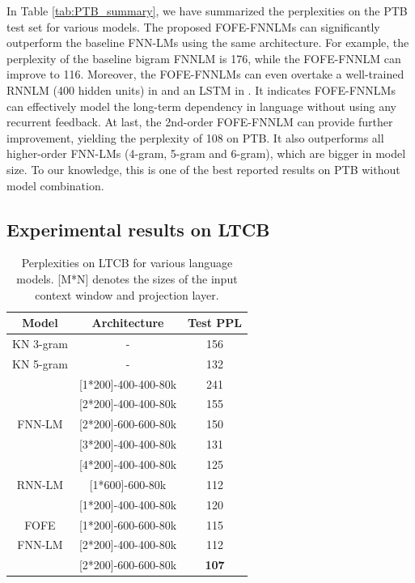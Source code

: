 \documentclass[11pt]{article}
\begin{document}
In Table \ref{tab:PTB_summary}, we have summarized the perplexities on the PTB test set for various models. The proposed FOFE-FNNLMs can significantly outperform the baseline FNN-LMs using the same architecture. 
For example, the perplexity of the baseline bigram FNNLM is 176, while the FOFE-FNNLM can improve to 116.  
Moreover, the FOFE-FNNLMs can even overtake a well-trained RNNLM (400 hidden units) in \cite{Mikolov2011Extension} and an LSTM in \cite{Graves2013}.  It indicates FOFE-FNNLMs can effectively model the long-term dependency in language without using any recurrent feedback. 
At last, the 2nd-order FOFE-FNNLM can provide further improvement, yielding the perplexity of 108 on PTB. It also outperforms all higher-order FNN-LMs (4-gram, 5-gram and 6-gram), which are bigger in model size. To our knowledge, this is one of the best reported results on PTB without model combination.
 
\subsection{Experimental results on LTCB}

\begin{table}[t]
	\centering
	\caption{Perplexities on LTCB for various language models. [M*N] denotes the sizes of the input context window and projection layer.} 
	\begin{tabular}{|c|c|c|}
		\hline
		Model & Architecture & Test PPL \\\hline
		KN 3-gram &   -                &    156 \\
		KN 5-gram &  -                 &   132  \\\hline
		        & [1*200]-400-400-80k & 241 \\
		        & [2*200]-400-400-80k & 155\\
		FNN-LM  & [2*200]-600-600-80k & 150 \\
			    & [3*200]-400-400-80k & 131 \\
			    & [4*200]-400-400-80k & 125 \\ \hline
		RNN-LM   & [1*600]-600-80k       &   112 \\\hline
		              & [1*200]-400-400-80k & 120 \\
		FOFE    & [1*200]-600-600-80k &  115\\
		FNN-LM   & [2*200]-400-400-80k & 112\\
		              & [2*200]-600-600-80k  & {\bf 107} \\\hline

	\end{tabular} 
	\label{tab:WIKI_summary}
\end{table}
\end{document}

